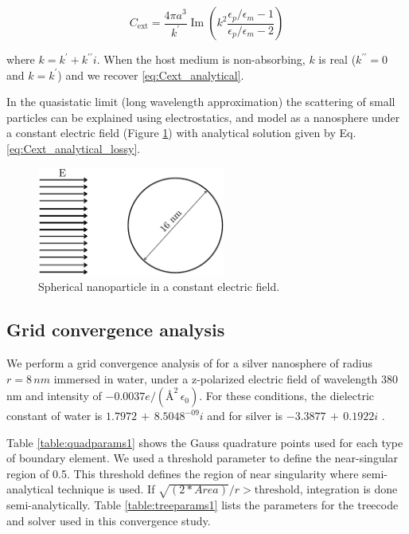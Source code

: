 \begin{equation} \label{eq:Cext_analytical_lossy}
    C_\text{ext} = \frac{4\pi a^3}{k^\prime} \operatorname{Im}\left(k^2 \frac{\epsilon_p/\epsilon_m -1}{\epsilon_p/\epsilon_m -2}\right)
\end{equation}

where $k=k^\prime + k^{\prime\prime}i$. When the host medium is 
non-absorbing, $k$ is real ($k^{\prime\prime} = 0$ and $k=k^\prime$) and we 
recover \eqref{eq:Cext_analytical}. 

In the quasistatic limit (long wavelength approximation) the scattering 
of small particles can be explained using electrostatics, and model as
a nanosphere under a constant electric field (Figure \ref{fig:sph_field}) 
with analytical solution given by Eq. \eqref{eq:Cext_analytical_lossy}.

\begin{figure}%
    \centering
    \includegraphics[width=0.55\textwidth]{sphere_field_8nm.pdf} 
    \caption{Spherical nanoparticle in a constant electric field.}
    \label{fig:sph_field}
\end{figure}

\subsection{Grid convergence analysis}\label{sub_sec:grid_conv_iso}

We perform a grid convergence analysis of \pygbe for a silver nanosphere 
of radius $r=8\,nm$ immersed in water, under a z-polarized electric field
of wavelength 380 nm and intensity of $-0.0037 e/(\text{\AA}^2 \, \epsilon_0)$.
For these conditions, the dielectric constant of water is
$1.7972 \, + \, 8.5048^{-09}i$ \cite{HaleQuerry1972} and for silver is
$-3.3877 \, + \, 0.1922i$ \cite{JohnsonChristy1972}. 

Table  \ref{table:quadparams1} shows the Gauss quadrature points used for each 
type of boundary element. We used a threshold parameter to define the near-singular
region of 0.5. This threshold defines the region of near singularity where 
semi-analytical technique is used. If $\sqrt{(2*Area)}/r > \text{threshold}$,
integration is done semi-analytically.
Table \ref{table:treeparams1} lists the parameters for the treecode and solver 
used in this convergence study.

